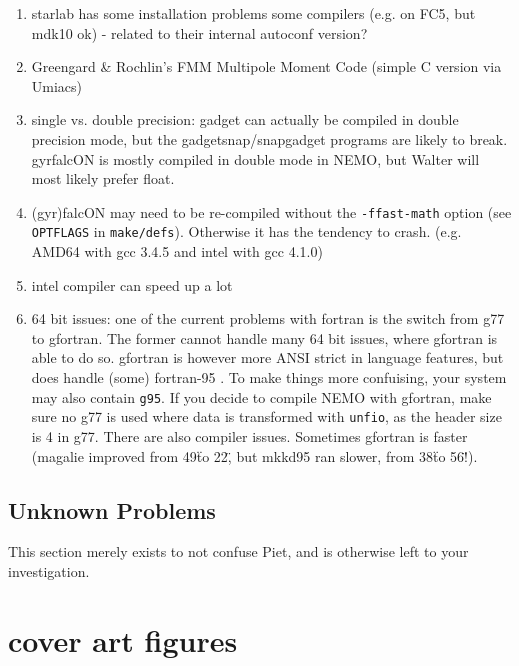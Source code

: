 \begin{enumerate}
\item
starlab has some installation
problems some compilers (e.g. on FC5, but mdk10 ok) - related to their internal
autoconf version?

\item
Greengard \& Rochlin's FMM Multipole Moment Code (simple C version via Umiacs)

\item
single vs. double precision:  gadget can actually be compiled in double precision
mode, but the gadgetsnap/snapgadget programs are likely to break.  gyrfalcON is
mostly compiled in double mode in NEMO, but Walter will most likely
prefer float.

\item 
(gyr)falcON may need to be re-compiled without the  {\tt -ffast-math} option
(see {\tt OPTFLAGS} in  {\tt make/defs}). Otherwise it has the tendency to crash.
(e.g. AMD64 with gcc 3.4.5 and intel with gcc 4.1.0)

\item 
intel compiler can speed up a lot 

\item
64 bit issues:
one of the current problems with fortran is the switch from g77 to gfortran. The former
cannot handle many 64 bit issues, where gfortran is able to do so. gfortran is however
more ANSI strict in language features, but does handle (some) fortran-95 . To make 
things more confuising, your system may also contain {\tt g95}. If you decide to compile
NEMO with gfortran, make sure no g77 is used where data is transformed with {\tt unfio},
as the header size is 4 in g77. There are also compiler issues. Sometimes
gfortran is faster (magalie improved from 49\" to 22\", but mkkd95 ran slower,
from 38\" to 56\"!).

\end{enumerate}

\section{Unknown Problems}

This section merely exists to not confuse Piet, and is otherwise
left to your investigation.



\cleardoublepage
\chapter*{cover art figures}
\begin{figure}[t]
\end{figure}

